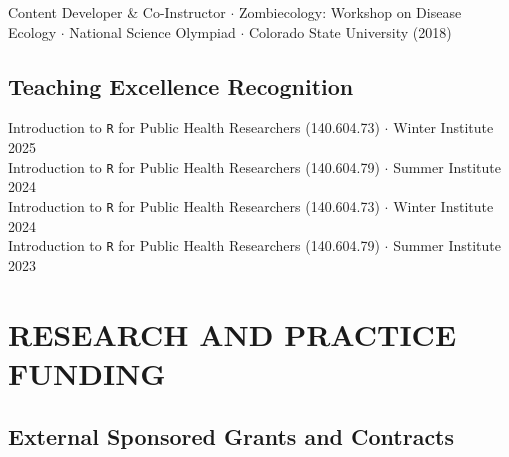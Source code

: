 \documentclass{cv}
\begin{document}
Content Developer \& Co-Instructor $\cdot$ Zombiecology: Workshop on Disease Ecology $\cdot$ National Science Olympiad $\cdot$ Colorado State University (2018)






\subsection*{Teaching Excellence Recognition}

Introduction to \texttt{R} for Public Health Researchers (140.604.73) $\cdot$ Winter Institute 2025 \\
Introduction to \texttt{R} for Public Health Researchers (140.604.79) $\cdot$ Summer Institute 2024 \\
Introduction to \texttt{R} for Public Health Researchers (140.604.73) $\cdot$ Winter Institute 2024 \\
Introduction to \texttt{R} for Public Health Researchers (140.604.79) $\cdot$ Summer Institute 2023


\section*{RESEARCH AND PRACTICE FUNDING}

\subsection*{External Sponsored Grants and Contracts}
\end{document}
